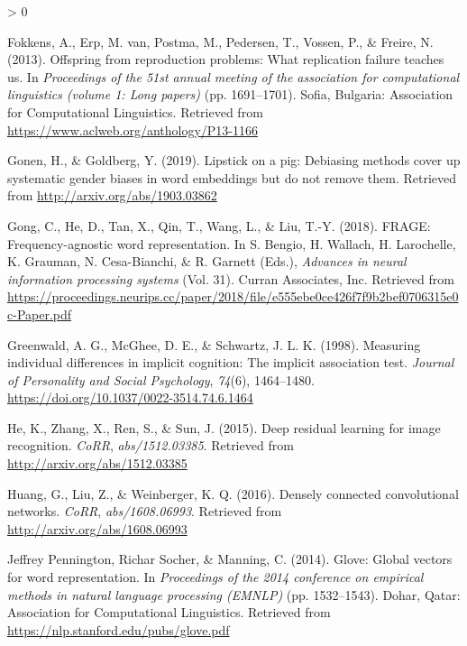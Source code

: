 \documentclass[
  english,
  man,floatsintext]{apa6}
\newlength{\cslhangindent}
\newenvironment{CSLReferences}[2] %
 {%
  \setlength{\parindent}{0pt}
  \ifodd #1 \everypar{\setlength{\hangindent}{\cslhangindent}}\ignorespaces\fi
  \ifnum #2 > 0
  \setlength{\parskip}{#2\baselineskip}
  \fi
 }%
 {}
\begin{document}
\begin{CSLReferences}{1}{0}
\leavevmode\hypertarget{ref-fokkens_2013}{}%
Fokkens, A., Erp, M. van, Postma, M., Pedersen, T., Vossen, P., \& Freire, N. (2013). Offspring from reproduction problems: What replication failure teaches us. In \emph{Proceedings of the 51st annual meeting of the association for computational linguistics (volume 1: Long papers)} (pp. 1691--1701). Sofia, Bulgaria: Association for Computational Linguistics. Retrieved from \url{https://www.aclweb.org/anthology/P13-1166}

\leavevmode\hypertarget{ref-gonen_2019}{}%
Gonen, H., \& Goldberg, Y. (2019). Lipstick on a pig: Debiasing methods cover up systematic gender biases in word embeddings but do not remove them. Retrieved from \url{http://arxiv.org/abs/1903.03862}

\leavevmode\hypertarget{ref-gong_2018}{}%
Gong, C., He, D., Tan, X., Qin, T., Wang, L., \& Liu, T.-Y. (2018). FRAGE: Frequency-agnostic word representation. In S. Bengio, H. Wallach, H. Larochelle, K. Grauman, N. Cesa-Bianchi, \& R. Garnett (Eds.), \emph{Advances in neural information processing systems} (Vol. 31). Curran Associates, Inc. Retrieved from \url{https://proceedings.neurips.cc/paper/2018/file/e555ebe0ce426f7f9b2bef0706315e0c-Paper.pdf}

\leavevmode\hypertarget{ref-greenwald_1998}{}%
Greenwald, A. G., McGhee, D. E., \& Schwartz, J. L. K. (1998). Measuring individual differences in implicit cognition: The implicit association test. \emph{Journal of Personality and Social Psychology}, \emph{74}(6), 1464--1480. \url{https://doi.org/10.1037/0022-3514.74.6.1464}

\leavevmode\hypertarget{ref-he_2015}{}%
He, K., Zhang, X., Ren, S., \& Sun, J. (2015). Deep residual learning for image recognition. \emph{CoRR}, \emph{abs/1512.03385}. Retrieved from \url{http://arxiv.org/abs/1512.03385}

\leavevmode\hypertarget{ref-huang_2016}{}%
Huang, G., Liu, Z., \& Weinberger, K. Q. (2016). Densely connected convolutional networks. \emph{CoRR}, \emph{abs/1608.06993}. Retrieved from \url{http://arxiv.org/abs/1608.06993}

\leavevmode\hypertarget{ref-pennington_2014}{}%
Jeffrey Pennington, Richar Socher, \& Manning, C. (2014). Glove: Global vectors for word representation. In \emph{Proceedings of the 2014 conference on empirical methods in natural language processing (EMNLP)} (pp. 1532--1543). Dohar, Qatar: Association for Computational Linguistics. Retrieved from \url{https://nlp.stanford.edu/pubs/glove.pdf}


\end{CSLReferences}
\end{document}
